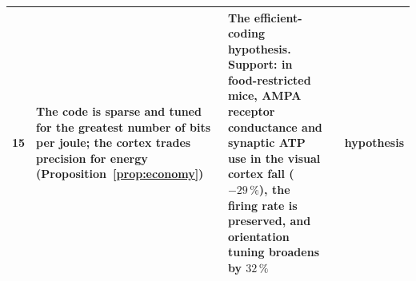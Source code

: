 {\begin{longtable}{>{\raggedright}p{0.5cm}>{\raggedright}p{4.0cm}>{\raggedright}p{5.6cm}>{\raggedright}p{2.3cm}>{\raggedright\arraybackslash}p{1.7cm}}
15 & The code is sparse and tuned for the greatest number of bits per joule; the cortex trades precision for energy (Proposition~\ref{prop:economy}) & The efficient-coding hypothesis. Support: in food-restricted mice, AMPA receptor conductance and synaptic ATP use in the visual cortex fall ($-29\,\%$), the firing rate is preserved, and orientation tuning broadens by $32\,\%$ & \cite{Barlow1961,Padamsey2022} & hypothesis \\
\bottomrule
\end{longtable}}
